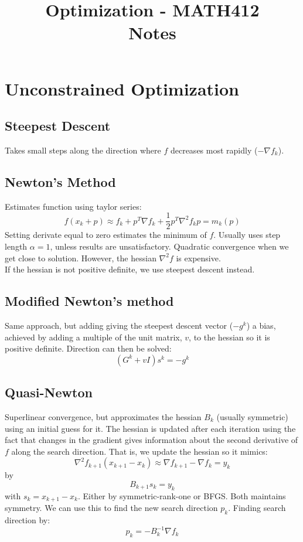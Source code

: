 \documentclass[a4paper, fleqn]{article}
\title{Optimization - MATH412 \\ Notes}
\begin{document}
\maketitle

\section{Unconstrained Optimization}

\subsection{Steepest Descent}
Takes small steps along the direction where $f$ decreases most rapidly ($-\nabla f_k$).

\subsection{Newton's Method}
Estimates function using taylor series:
$$
f(x_k+p)\approx f_k+p^T\nabla f_k +\frac{1}{2}p^T\nabla^2 f_k p = m_k(p)
$$
Setting derivate equal to zero estimates the minimum of $f$. Usually uses step length
$\alpha=1$, unless results are unsatisfactory. Quadratic convergence when we get close to
solution. However, the hessian $\nabla^2 f$ is expensive. \\
If the hessian is not positive definite, we use steepest descent instead.

\subsection{Modified Newton's method}
Same approach, but adding giving the steepest descent vector ($-g^k$) a bias, achieved by
adding a multiple of the unit matrix, $v$, to the hessian so it is positive definite.
Direction can then be solved:
$$
(G^k+vI)s^k = -g^k
$$

\subsection{Quasi-Newton}
Superlinear convergence, but approximates the hessian $B_k$ (usually symmetric) using an initial guess for
it. The hessian is updated after each iteration using the fact that changes in the
gradient gives information about the second derivative of $f$ along the search direction.
That is, we update the hessian so it mimics:
$$
\nabla^2 f_{k+1}(x_{k+1}-x_k)\approx \nabla f_{k+1}-\nabla f_k=y_k
$$
by
$$
B_{k+1}s_k=y_k
$$
with $s_k=x_{k+1}-x_k$. Either by symmetric-rank-one or BFGS. Both maintains symmetry. We
can use this to find the new search direction $p_k$. Finding search direction by:
$$
p_k=-B_k^{-1}\nabla f_k
$$
\end{document}
